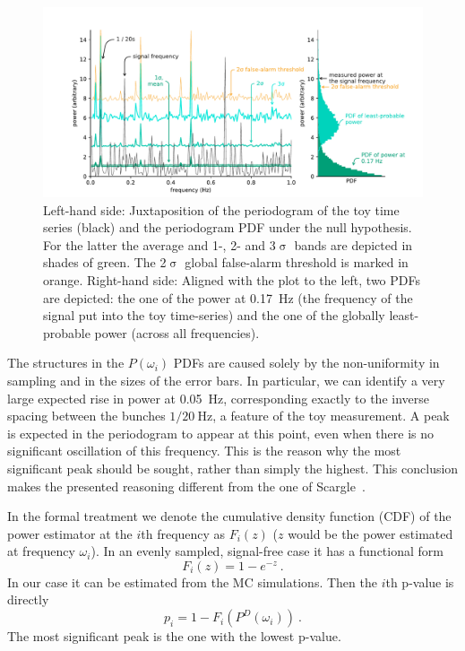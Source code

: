 \begin{figure}
  \centering \includegraphics[width=\linewidth]{gfx/axions/basic_detection.pdf}
  \caption{Left-hand side: Juxtaposition of the periodogram of the toy time series (black) and the periodogram PDF under the null hypothesis.
  For the latter the average and 1-, 2- and 3$\upsigma$ bands are depicted in shades of green.
  The 2$\upsigma$ global false-alarm threshold is marked in orange.
  Right-hand side: Aligned with the plot to the left, two PDFs are depicted: the one of the power at \SI{0.17}{\hertz} (the frequency of the signal put into the toy time-series) and the one of the globally least-probable power (across all frequencies).}\label{fig:basic_detection}
\end{figure}

The structures in the $P(\omega_i)$ PDFs are caused solely by the non-uniformity in sampling and in the sizes of the error bars.
In particular, we can identify a very large expected rise in power at \SI{0.05}{\hertz}, corresponding exactly to the inverse spacing between the bunches $1 / \SI{20}{\hertz}$, a feature of the toy measurement.
A peak is expected in the periodogram to appear at this point, even when there is no significant oscillation of this frequency.
This is the reason why the most significant peak should be sought, rather than simply the highest.
This conclusion makes the presented reasoning different from the one of Scargle~\cite{Scargle1982}.

In the formal treatment we denote the cumulative density function (CDF) of the power estimator at the $i$th frequency as $F_i(z)$ ($z$ would be the power estimated at frequency $\omega_i$).
In an evenly sampled, signal-free case it has a functional form
\begin{equation}
  \label{eq:local_functional_form}
  F_i(z) = 1 - e^{-z} \ .
\end{equation}
In our case it can be estimated from the MC simulations.
Then the $i$th p-value is directly
\begin{equation} \label{eq:local_p_value}
  p_i = 1 - F_i\left( P^D(\omega_i) \right) \ .
\end{equation}
The most significant peak is the one with the lowest p-value.

